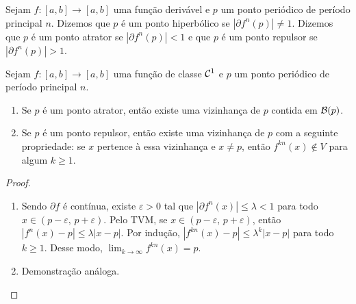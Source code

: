 \begin{definition}
Sejam $f: [a, b] \to [a, b]$ uma função derivável e $p$ um ponto periódico de período principal $n$. Dizemos que $p$ é um ponto hiperbólico se $|\partial f^n(p)| \neq 1$. Dizemos que $p$ é um ponto atrator se $|\partial f^n(p)| < 1$ e que $p$ é um ponto repulsor se $|\partial f^n(p)| > 1$.
\end{definition}

\begin{theorem}
Sejam $f: [a, b] \to [a, b]$ uma função de classe $\mathcal{C}^1$ e $p$ um ponto periódico de período principal $n$.
\begin{enumerate}
\item Se $p$ é um ponto atrator, então existe uma vizinhança de $p$ contida em $\mathcal{B}(p)$.
\item Se $p$ é um ponto repulsor, então existe uma vizinhança de $p$ com a seguinte propriedade: se $x$ pertence à essa vizinhança e $x \neq p$, então  $f^{kn}(x) \notin V$ para algum $k \geq 1$. 
\end{enumerate}
\end{theorem}

\begin{proof}
\begin{enumerate}
\item Sendo $\partial f$ é contínua, existe $\varepsilon > 0$ tal que $|\partial f^n(x)| \leq \lambda < 1$ para todo $x \in (p - \varepsilon,\, p + \varepsilon)$. Pelo TVM, se $x \in (p - \varepsilon,\, p + \varepsilon)$, então $|f^n(x) - p| \leq \lambda|x - p|$. Por indução, $|f^{kn}(x) - p| \leq \lambda^k|x - p|$ para todo $k \geq 1$. Desse modo, $\lim_{k \to \infty} f^{kn}(x) = p$.
\item Demonstração análoga.
\end{enumerate}
\end{proof}
